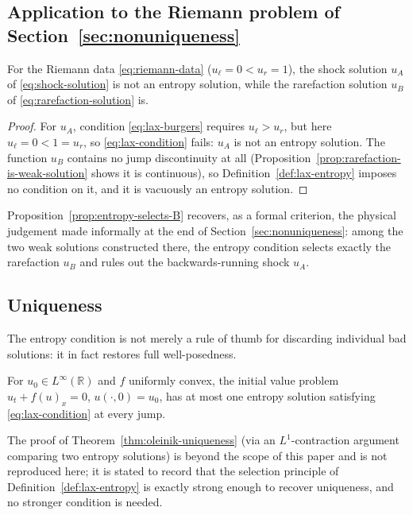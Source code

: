 \subsection{Application to the Riemann problem of Section~\ref{sec:nonuniqueness}}
\label{subsec:entropy-application}

\begin{proposition}
\label{prop:entropy-selects-B}
For the Riemann data \eqref{eq:riemann-data} ($u_\ell=0<u_r=1$), the
shock solution $u_A$ of \eqref{eq:shock-solution} is not an entropy
solution, while the rarefaction solution $u_B$ of
\eqref{eq:rarefaction-solution} is.
\end{proposition}

\begin{proof}
For $u_A$, condition \eqref{eq:lax-burgers} requires $u_\ell>u_r$, but
here $u_\ell=0<1=u_r$, so \eqref{eq:lax-condition} fails: $u_A$ is not an
entropy solution. The function $u_B$ contains no jump discontinuity at
all (Proposition~\ref{prop:rarefaction-is-weak-solution} shows it is
continuous), so Definition~\ref{def:lax-entropy} imposes no condition on
it, and it is vacuously an entropy solution.
\end{proof}

Proposition~\ref{prop:entropy-selects-B} recovers, as a formal criterion,
the physical judgement made informally at the end of
Section~\ref{sec:nonuniqueness}: among the two weak solutions
constructed there, the entropy condition selects exactly the rarefaction
$u_B$ and rules out the backwards-running shock $u_A$.

\subsection{Uniqueness}
\label{subsec:entropy-uniqueness}

The entropy condition is not merely a rule of thumb for discarding
individual bad solutions: it in fact restores full well-posedness.

\begin{theorem}
\label{thm:oleinik-uniqueness}
For $u_0 \in L^\infty(\mathbb{R})$ and $f$ uniformly convex, the initial
value problem $u_t+f(u)_x=0$, $u(\cdot,0)=u_0$, has at most one entropy
solution satisfying \eqref{eq:lax-condition} at every jump.
\end{theorem}

The proof of Theorem~\ref{thm:oleinik-uniqueness} (via an $L^1$-contraction
argument comparing two entropy solutions) is beyond the scope of this
paper and is not reproduced here; it is stated to record that the
selection principle of Definition~\ref{def:lax-entropy} is exactly strong
enough to recover uniqueness, and no stronger condition is needed.